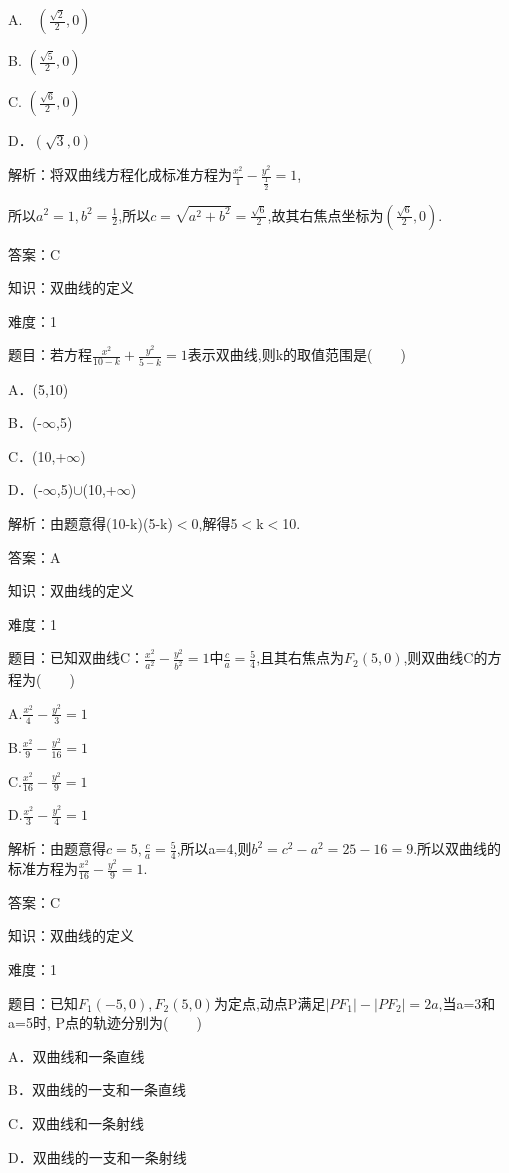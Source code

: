 \documentclass{article} %
\begin{document}
A.　$(\frac{\sqrt{2}}{2},0)$　　　　　 

B. $(\frac{\sqrt{5}}{2},0)$

C. $(\frac{\sqrt{6}}{2},0)$

D．$(\sqrt{3},0)$

解析：将双曲线方程化成标准方程为$\frac{x^2}{1}-\frac{y^2}{\frac{1}{2}}=1$,

所以$a^{2}=1,b^{2}=\frac{1}{2}$,所以$c=\sqrt{a^2+b^2}=\frac{\sqrt{6}}{2}$,故其右焦点坐标为$(\frac{\sqrt{6}}{2},0)$.

答案：C

知识：双曲线的定义

难度：1

题目：若方程$\frac{x^2}{10-k}+\frac{y^2}{5-k}=1$表示双曲线,则k的取值范围是(　　)

A．(5,10)   

B．(-${\infty}$,5)

C．(10,+${\infty}$)   

D．(-${\infty}$,5)${\cup}$(10,+${\infty}$)

解析：由题意得(10-k)(5-k)${<}$0,解得5${<}$k${<}$10.

答案：A



知识：双曲线的定义

难度：1

题目：已知双曲线C：$\frac{x^2}{a^2}-\frac{y^2}{b^2}=1$中$\frac{c}{a}=\frac{5}{4}$,且其右焦点为$F_{2}(5,0)$,则双曲线C的方程为(　　)

A.$\frac{x^2}{4}-\frac{y^2}{3}=1$   

B.$\frac{x^2}{9}-\frac{y^2}{16}=1$

C.$\frac{x^2}{16}-\frac{y^2}{9}=1$   

D.$\frac{x^2}{3}-\frac{y^2}{4}=1$

解析：由题意得$c=5,\frac{c}{a}=\frac{5}{4}$,所以a=4,则$b^{2}=c^{2}-a^{2}=25-16=9$.所以双曲线的标准方程为$\frac{x^2}{16}-\frac{y^2}{9}=1$.

答案：C



知识：双曲线的定义

难度：1

题目：已知$F_{1}(-5,0),F_{2}(5,0)$为定点,动点P满足$|PF_1|-|PF_2|=2a$,当a=3和a=5时, P点的轨迹分别为(　　)

A．双曲线和一条直线

B．双曲线的一支和一条直线

C．双曲线和一条射线

D．双曲线的一支和一条射线
\end{document}
